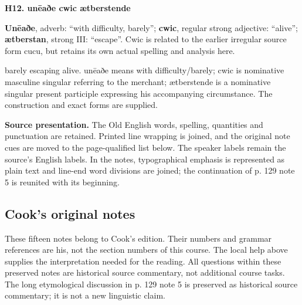 \par\begin{minipage}{\linewidth}\raggedright
\textbf{H12. unēaðe cwic ætberstende}

\textbf{Unēaðe}, adverb: “with difficulty, barely”; \textbf{cwic}, regular strong adjective: “alive”; \textbf{ætberstan}, strong III: “escape”. Cwic is related to the earlier irregular source form cucu, but retains its own actual spelling and analysis here.

barely escaping alive. unēaðe means with difficulty/\allowbreak{}barely; cwic is nominative masculine singular referring to the merchant; ætberstende is a nominative singular present participle expressing his accompanying circumstance. The construction and exact forms are supplied.

\textbf{Source presentation.} The Old English words, spelling, quantities and punctuation are retained. Printed line wrapping is joined, and the original note cues are moved to the page-qualified list below. The speaker labels remain the source’s English labels. In the notes, typographical emphasis is represented as plain text and line-end word divisions are joined; the continuation of p. 129 note 5 is reunited with its beginning.

\end{minipage}\par\addvspace{4pt}

\subsection*{Cook’s original notes}

These fifteen notes belong to Cook’s edition. Their numbers and grammar references are his, not the section numbers of this course. The local help above supplies the interpretation needed for the reading. All questions within these preserved notes are historical source commentary, not additional course tasks. The long etymological discussion in p. 129 note 5 is preserved as historical source commentary; it is not a new linguistic claim.

